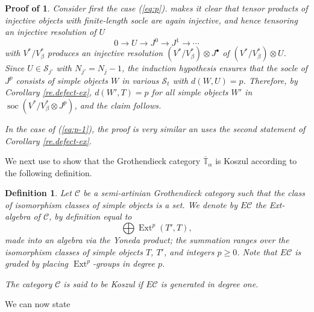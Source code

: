 \documentclass[11pt]{article}
\theoremstyle{plain}
\theoremstyle{nonumberplain}
\theoremstyle{plain}
\newtheorem{definition}[lemma]{Definition}
\theoremstyle{nonumberplain}
\newtheorem{proof-of-exts}{Proof of \Cref{th.exts}}
\newcommand\bT{\mathbb T}
\newcommand\cC{\mathcal C}
\newcommand\cS{\mathcal S}
\DeclareMathOperator{\ext}{\mathrm{Ext}}
\DeclareMathOperator{\soc}{\mathrm{soc}}
\begin{document}
\begin{proof-of-exts}
Consider first the case (\ref{eq:p}).  
 makes it clear that tensor products of
injective objects with finite-length socle are again injective, and
hence tensoring an injective resolution of $U$
\begin{equation*}
  0\to U\to J^0\to J^1\to\cdots
\end{equation*}
with $V^*/V^*_\beta$ produces an injective resolution $(V^*/V_\beta^*)\otimes J^\bullet$ of $(V^*/V^*_\beta)\otimes U$.  Since $U\in\mathcal{S}_{j'}$ with $N_{j'}=N_j-1$, the induction hypothesis ensures that the socle of $J^p$ consists of
simple objects $W$ in various $\cS_t$ with $d(W,U)=p$.  Therefore, by Corollary \ref{re.defect-ex}, $d\left(W',T\right)=p$ for all simple objects $W'$ in $\soc (V^*/V^*_\beta \otimes J^p)$, and the claim follows.

In the case of (\ref{eq:p-1}), the proof is very similar an uses the second statement of Corollary \ref{re.defect-ex}. 
\end{proof-of-exts}



We next use  to show that the Grothendieck category $\overline{\bT}_\alpha$ is
Koszul according to the following
definition. %

\begin{definition}\label{def.kosz-cat}
  Let $\cC$ be a semi-artinian Grothendieck category such that the
  class of isomorphism classes of simple objects is a set. We denote
  by $E\cC$ the {\it Ext-algebra} of $\cC$, by definition equal to
  \begin{equation*}
    \bigoplus \ext^p(T',T),
  \end{equation*}
  made into an algebra via the Yoneda product; the summation ranges over the isomorphism classes of simple objects $T$, $T'$, and integers $p\geq 0$. Note that $E\cC$ is
  graded by placing $\ext^p$-groups in degree $p$.

  The category $\cC$ is said to be {\it Koszul} if $E\cC$ is generated in degree
  one.
\end{definition}



We can now state
\end{document}
